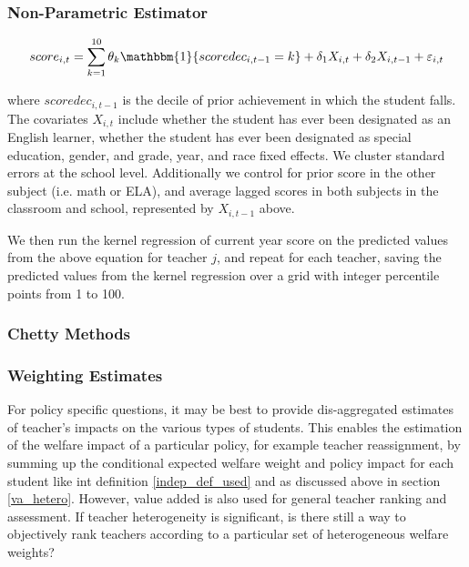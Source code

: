 \documentclass{article}
\theoremstyle{definition}
\theoremstyle{definition}
\theoremstyle{definition}
\theoremstyle{definition}
\begin{document}
        \subsubsection{Non-Parametric Estimator}
        
        \begin{align*}
            score_{i,t} = \sum_{k=1}^{10} \theta_k \mathbbm{1}\{scoredec_{i, t-1} = k\} + \delta_1 X_{i, t} + \delta_2 X_{i, t-1} + \varepsilon_{i, t}
        \end{align*}
            
        \noindent where $scoredec_{i, t-1}$ is the decile of prior achievement in which the student falls. The covariates $X_{i, t}$ include whether the student has ever been designated as an English learner, whether the student has ever been designated as special education, gender, and grade, year, and race fixed effects. We cluster standard errors at the school level. Additionally we control for prior score in the other subject (i.e. math or ELA), and average lagged scores in both subjects in the classroom and school, represented by $X_{i, t-1}$ above.
        
        \noindent We then run the kernel regression of current year score on the predicted values from the above equation for teacher $j$, and repeat for each teacher, saving the predicted values from the kernel regression over a grid with integer percentile points from 1 to 100.

        \subsubsection{Chetty Methods}
        
        \subsubsection{Weighting Estimates}
        For policy specific questions, it may be best to provide dis-aggregated estimates of teacher's impacts on the various types of students. This enables the estimation of the welfare impact of a particular policy, for example teacher reassignment, by summing up the conditional expected welfare weight and policy impact for each student like int definition \ref{indep_def_used} and as discussed above in section \ref{va_hetero}. However, value added is also used for general teacher ranking and assessment. If teacher heterogeneity is significant, is there still a way to objectively rank teachers according to a particular set of heterogeneous welfare weights? 
        
\end{document}
